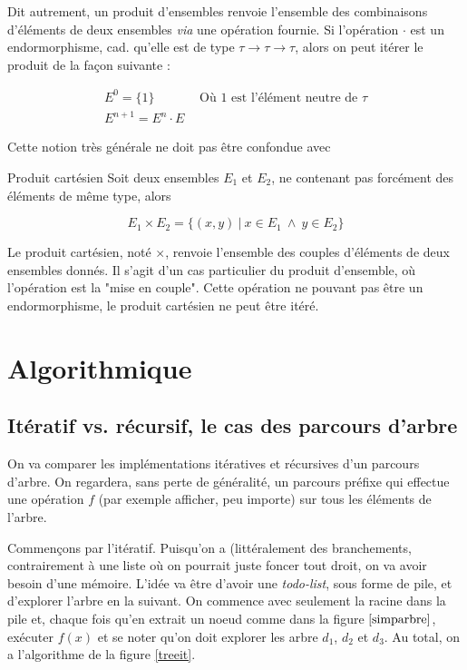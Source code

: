 Dit autrement, un produit d'ensembles renvoie l'ensemble des combinaisons d'éléments de deux ensembles \textit{via} une opération fournie. Si l'opération $\cdot$ est un endormorphisme, cad. qu'elle est de type $\tau \rightarrow \tau \rightarrow \tau$, alors on peut itérer le produit de la façon suivante :

\begin{eqnarray*}
E^0 = \{1\} ~~~~~~~~~~~~~~~~ \textrm{Où $1$ est l'élément neutre de $\tau$} \\
E^{n+1} = E^n \cdot E
\end{eqnarray*}

Cette notion très générale ne doit pas être confondue avec

\begin{definition}{Produit cartésien}{}
Soit deux ensembles $E_1$ et $E_2$, ne contenant pas forcément des éléments de même type, alors

\[
E_1 \times E_2 = \{(x,y)~|~x \in E_1~\wedge~y \in E_2\}
\]
\end{definition}

Le produit cartésien, noté $\times$, renvoie l'ensemble des couples d'éléments de deux ensembles donnés. Il s'agit d'un cas particulier du produit d'ensemble, où l'opération est la "mise en couple". Cette opération ne pouvant pas être un endormorphisme, le produit cartésien ne peut être itéré.

\section{Algorithmique}

\subsection{Itératif vs. récursif, le cas des parcours d'arbre}
\label{itersif}
On va comparer les implémentations itératives et récursives d'un parcours d'arbre. On regardera, sans perte de généralité, un parcours préfixe qui effectue une opération $f$ (par exemple afficher, peu importe) sur tous les éléments de l'arbre.

Commençons par l'itératif. Puisqu'on a (littéralement des branchements, contrairement à une liste où on pourrait juste foncer tout droit, on va avoir besoin d'une mémoire. L'idée va être d'avoir une \textit{todo-list}, sous forme de pile, et d'explorer l'arbre en la suivant. On commence avec seulement la racine dans la pile et, chaque fois qu'en extrait un noeud comme dans la figure $\ref{simparbre}$, exécuter $f(x)$ et se noter qu'on doit explorer les arbre $d_1$, $d_2$ et $d_3$. Au total, on a l'algorithme de la figure \ref{treeit}.


